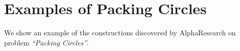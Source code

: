 




\section{Examples of Packing Circles}
\label{app:examples}
We show an example of the constructions discovered by AlphaResearch on problem \emph{``Packing Circles''}.



